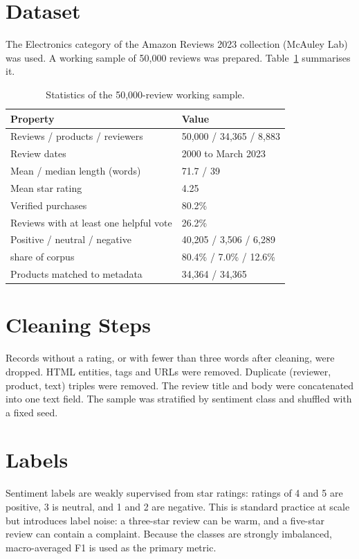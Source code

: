 \documentclass[12pt,a4paper]{report}
\begin{document}
\section{Dataset}
The Electronics category of the Amazon Reviews 2023 collection (McAuley Lab) \cite{hou2024bridging} was used. A working sample of 50,000 reviews was prepared. Table~\ref{tab:data} summarises it.
\begin{table}[htbp]
\centering
\caption{Statistics of the 50,000-review working sample.}\label{tab:data}
\begin{tabular}{@{}ll@{}}
\toprule
Property & Value \\
\midrule
Reviews / products / reviewers & 50,000 / 34,365 / 8,883 \\
Review dates & 2000 to March 2023 \\
Mean / median length (words) & 71.7 / 39 \\
Mean star rating & 4.25 \\
Verified purchases & 80.2\% \\
Reviews with at least one helpful vote & 26.2\% \\
Positive / neutral / negative & 40,205 / 3,506 / 6,289 \\
\quad share of corpus & 80.4\% / 7.0\% / 12.6\% \\
Products matched to metadata & 34,364 / 34,365 \\
\bottomrule
\end{tabular}
\end{table}

\section{Cleaning Steps}
Records without a rating, or with fewer than three words after cleaning, were dropped. HTML entities, tags and URLs were removed. Duplicate (reviewer, product, text) triples were removed. The review title and body were concatenated into one text field. The sample was stratified by sentiment class and shuffled with a fixed seed.

\section{Labels}
Sentiment labels are weakly supervised from star ratings: ratings of 4 and 5 are positive, 3 is neutral, and 1 and 2 are negative. This is standard practice at scale but introduces label noise: a three-star review can be warm, and a five-star review can contain a complaint. Because the classes are strongly imbalanced, macro-averaged F1 is used as the primary metric.
\end{document}
